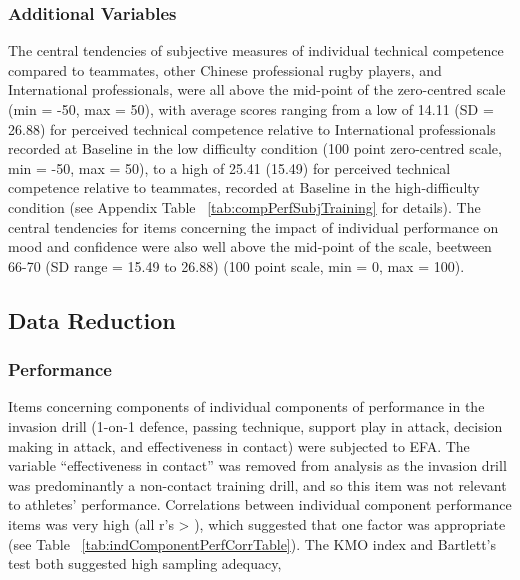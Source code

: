 \subsubsection{Additional Variables\label{app6:additionalVariables}}







The central tendencies of subjective measures of individual technical competence compared to teammates, other Chinese professional rugby players, and International professionals, were all above the mid-point of the zero-centred scale (min = -50, max = 50), with average scores ranging from  a low of 14.11 (SD = 26.88) for perceived technical competence relative to International professionals recorded at Baseline in the low difficulty condition (100 point zero-centred scale, min = -50, max = 50), to a high of 25.41 (15.49) for perceived technical competence relative to teammates, recorded at Baseline in the high-difficulty condition (see Appendix Table ~\ref{tab:compPerfSubjTraining} for details).  The central tendencies for items concerning the impact of individual performance on mood and confidence were also well above the mid-point of the scale, beetween 66-70 (SD range = 15.49 to 26.88) (100 point scale, min = 0, max = 100).



\subsection{Data Reduction\label{app6:dataReduction}}





\subsubsection{Performance\label{app6:dataReductionPerformance}}
Items concerning components of individual components of performance in the invasion drill (1-on-1 defence, passing technique, support play in attack, decision making in attack, and effectiveness in contact) were subjected to EFA.  The variable ``effectiveness in contact'' was removed from analysis as the invasion drill was predominantly a non-contact training drill, and so this item was not relevant to athletes' performance.  Correlations between individual component performance items was very high (all r's > ), which suggested that one factor was appropriate (see Table ~\ref{tab:indComponentPerfCorrTable}).
The KMO index and Bartlett's test both suggested high sampling adequacy,

